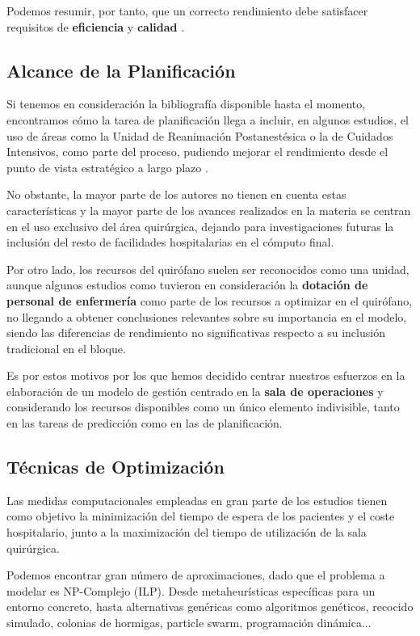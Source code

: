 Podemos resumir, por tanto, que un correcto rendimiento debe satisfacer requisitos de \textbf{eficiencia }y \textbf{calidad} \cite{Sandbaek2014ImpactEfficiency}.


\subsection{Alcance de la Planificación}

Si tenemos en consideración la bibliografía disponible hasta el momento, encontramos cómo la tarea de planificación llega a incluir, en algunos estudios, el uso de áreas como la Unidad de Reanimación Postanestésica o la de Cuidados Intensivos, como parte del proceso, pudiendo mejorar el rendimiento desde el punto de vista estratégico a largo plazo \cite{Gur2018ApplicationOverview}.

No obstante, la mayor parte de los autores no tienen en cuenta estas características y la mayor parte de los avances realizados en la materia se centran en el uso exclusivo del área quirúrgica, dejando para investigaciones futuras la inclusión del resto de facilidades hospitalarias en el cómputo final.

Por otro lado, los recursos del quirófano suelen ser reconocidos como una unidad, aunque algunos estudios como \cite{DiMartinelly2014AnScheduling} tuvieron en consideración la \textbf{dotación de personal de enfermería }como parte de los recursos a optimizar en el quirófano, no llegando a obtener conclusiones relevantes sobre su importancia en el modelo, siendo las diferencias de rendimiento no significativas respecto a su inclusión tradicional en el bloque.

Es por estos motivos por los que hemos decidido centrar nuestros esfuerzos en la elaboración de un modelo de gestión centrado en la \textbf{sala de operaciones} y considerando los recursos disponibles como un único elemento indivisible, tanto en las tareas de predicción como en las de planificación.

\subsection{Técnicas de Optimización}

Las medidas computacionales empleadas en gran parte de los estudios tienen como objetivo la minimización del tiempo de espera de los pacientes y el coste hospitalario, junto a la maximización del tiempo de utilización de la sala quirúrgica.

Podemos encontrar gran número de aproximaciones, dado que el problema a modelar es NP-Complejo (ILP). Desde metaheurísticas específicas para un entorno concreto, hasta alternativas genéricas como algoritmos genéticos, recocido simulado, colonias de hormigas, particle swarm, programación dinámica... 

